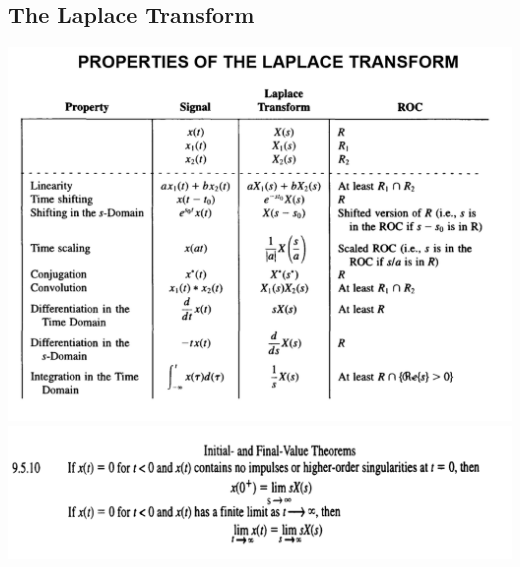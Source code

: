 \documentclass[landscape,a4paper]{article}
\begin{document}
\setcounter{section}{8}

\newpage
\begin{multicols}{2}
\section{The Laplace Transform}
\includegraphics[width=\linewidth]{p1.png}
\includegraphics[width=\linewidth]{p7.png}


\end{multicols}
\end{document}

